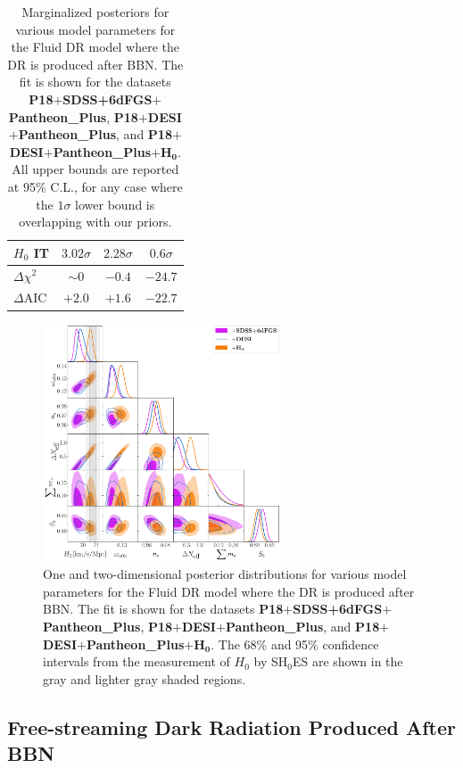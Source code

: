 \documentclass[aps,prd,twocolumn,notitlepage,
superscriptaddress,
nofootinbib,floatfix]{revtex4-2}
\newcommand{\planck}{\textbf{P18}}
\newcommand{\desi}{$\mathbf{+}$\textbf{DESI}}
\newcommand{\boss}{$\mathbf{+}$\textbf{SDSS+6dFGS}}
\newcommand{\pantheon}{$\mathbf{+}${\bf Pantheon\_Plus}}
\newcommand{\shoes}{$\mathbf{+ H_0}$}
\begin{document}
\begin{widetext}
\begin{table}[H]
\begin{tabular} {| l | c| c| c|}
\hline
$H_0$ IT & $3.02\sigma $ & $2.28\sigma $ & $0.6\sigma $\\
\hline
$\Delta \chi^2$ & $\sim 0$ & $-0.4$ & $-24.7$\\
\hline
$\Delta$AIC & $+2.0$ & $+1.6$ & $-22.7$\\
\hline
\end{tabular}
\caption{Marginalized posteriors for various model parameters for the Fluid DR model where the DR is produced after BBN. The fit is shown for the datasets \planck\boss\pantheon, \planck\desi\pantheon, and \planck\desi\pantheon\shoes. All upper bounds are reported at 95\% C.L., for any case where the $1\sigma$ lower bound is overlapping with our priors.}
\end{table}


\begin{figure}[H]
\centering
    \includegraphics[width=0.63\textwidth]{figures_21_4/all_sidrnb.pdf}
    \caption{One and two-dimensional posterior distributions for various model parameters for the Fluid DR model where the DR is produced after BBN. The fit is shown for the datasets \planck\boss\pantheon, \planck\desi\pantheon, and \planck\desi\pantheon\shoes. The 68\% and 95\% confidence intervals from the measurement of $H_0$ by SH$_0$ES are shown in the gray and lighter gray shaded regions.}
\end{figure}

\subsection{Free-streaming Dark Radiation Produced After BBN}\label{app:FS_afterbbn}



\end{widetext}
\end{document}
